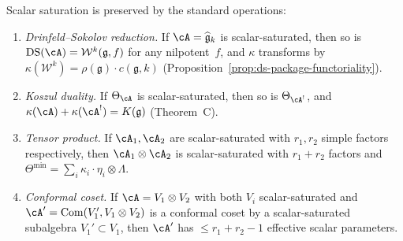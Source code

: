 \begin{proposition}
\label{prop:saturation-functorial}
Scalar saturation is preserved by the standard operations:
\begin{enumerate}[label=\textup{(\alph*)}]
\item \emph{Drinfeld--Sokolov reduction.}
  If\/ $\cA = \widehat{\mathfrak{g}}_k$ is
  scalar-saturated, then so is
  $\mathrm{DS}(\cA) = \mathcal{W}^k(\mathfrak{g},f)$ for any
  nilpotent~$f$, and $\kappa$ transforms by
  $\kappa(\mathcal{W}^k) = \rho(\mathfrak{g})\cdot c(\mathfrak{g},k)$
  \textup{(}Proposition~\textup{\ref{prop:ds-package-functoriality}}\textup{)}.
\item \emph{Koszul duality.}
  If\/ $\Theta_{\cA}$ is scalar-saturated, then so is
  $\Theta_{\cA^!}$, and
  $\kappa(\cA) + \kappa(\cA^!) = K(\mathfrak{g})$
  \textup{(}Theorem~\textup{C}\textup{)}.
\item \emph{Tensor product.}
  If\/ $\cA_1, \cA_2$ are scalar-saturated with $r_1, r_2$
  simple factors respectively, then
  $\cA_1 \otimes \cA_2$ is scalar-saturated with $r_1 + r_2$
  factors and $\Theta^{\min} = \sum_{i} \kappa_i \cdot
  \eta_i \otimes \Lambda$.
\item \emph{Conformal coset.}
  If\/ $\cA = V_1 \otimes V_2$ with both $V_i$
  scalar-saturated and
  $\cA' = \mathrm{Com}(V_1', V_1 \otimes V_2)$ is
  a conformal coset by a scalar-saturated subalgebra
  $V_1' \subset V_1$, then $\cA'$ has $\leq r_1 + r_2 - 1$
  effective scalar parameters.
\end{enumerate}
\end{proposition}

